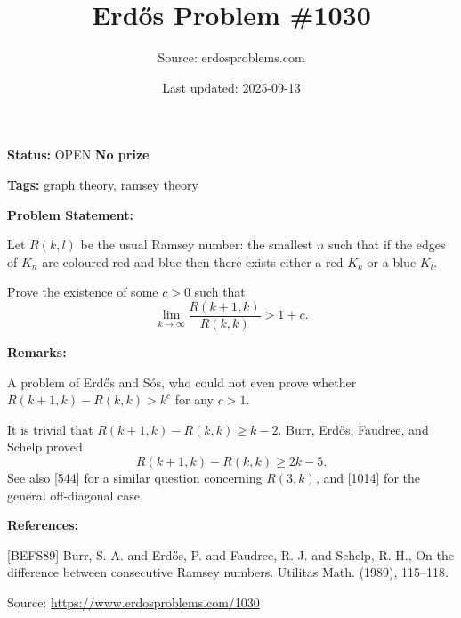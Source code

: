 \documentclass{article}
\title{Erd\H{o}s Problem \#1030}
\date{Last updated: 2025-09-13}
\author{Source: erdosproblems.com}
\begin{document}
\maketitle

\noindent\textbf{Status:} OPEN \quad \textbf{No prize}

\noindent\textbf{Tags:} graph theory, ramsey theory

\medskip
\noindent\textbf{Problem Statement:}

Let $R(k,l)$ be the usual Ramsey number: the smallest $n$ such that if the edges of $K_n$ are coloured red and blue then there exists either a red $K_k$ or a blue $K_l$.

Prove the existence of some $c>0$ such that\[\lim_{k\to \infty}\frac{R(k+1,k)}{R(k,k)}> 1+c.\]

\bigskip
\noindent\textbf{Remarks:}

A problem of Erd\H{o}s and S\'{o}s, who could not even prove whether $R(k+1,k)-R(k,k)>k^c$ for any $c>1$.

It is trivial that $R(k+1,k)-R(k,k)\geq k-2$. Burr, Erd\H{o}s, Faudree, and Schelp \cite{BEFS89} proved\[R(k+1,k)-R(k,k)\geq 2k-5.\]See also [544] for a similar question concerning $R(3,k)$, and [1014] for the general off-diagonal case.

\bigskip
\noindent\textbf{References:}

[BEFS89] Burr, S. A. and Erd\H{o}s, P. and Faudree, R. J. and Schelp, R.
H., On the difference between consecutive {R}amsey numbers. Utilitas Math. (1989), 115--118.

\bigskip
\noindent\small{Source: \url{https://www.erdosproblems.com/1030}}
\end{document}
